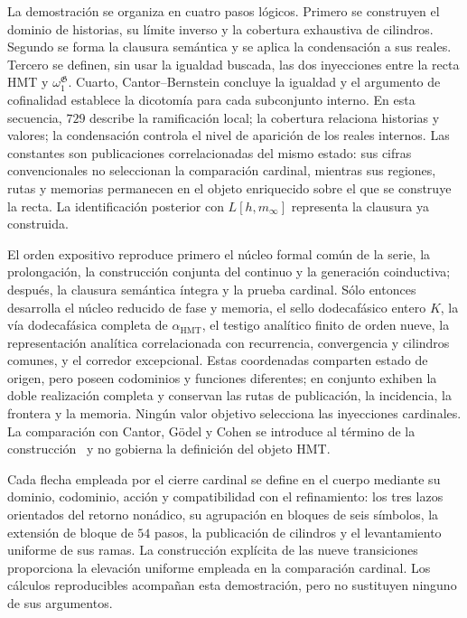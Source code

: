 La demostración se organiza en cuatro pasos lógicos. Primero se construyen el
dominio de historias, su límite inverso y la cobertura exhaustiva de cilindros.
Segundo se forma la clausura semántica y se aplica la condensación a sus reales.
Tercero se definen, sin usar la igualdad buscada, las dos inyecciones entre la
recta HMT y \(\omega_1^{\mathfrak G}\). Cuarto, Cantor--Bernstein concluye la
igualdad y el argumento de cofinalidad establece la dicotomía para cada
subconjunto interno. En esta secuencia, \(729\) describe la ramificación local;
la cobertura relaciona historias y valores; la condensación controla el nivel
de aparición de los reales internos. Las constantes son publicaciones
correlacionadas del mismo estado: sus cifras convencionales no seleccionan la
comparación cardinal, mientras sus regiones, rutas y memorias permanecen en el
objeto enriquecido sobre el que se construye la recta. La
identificación posterior con \(L[h,m_\infty]\) representa la clausura ya
construida.

El orden expositivo reproduce primero el núcleo formal común de la serie, la
prolongación, la construcción conjunta del continuo y la generación
coinductiva; después, la clausura semántica íntegra y la prueba cardinal. Sólo
entonces desarrolla el núcleo reducido de fase y memoria, el sello
dodecafásico entero \(K\), la vía dodecafásica completa de
\(\alpha_{\mathrm{HMT}}\), el testigo analítico finito de orden nueve, la
representación analítica correlacionada con recurrencia, convergencia y
cilindros comunes, y el corredor excepcional. Estas coordenadas comparten
estado de origen, pero poseen codominios y funciones diferentes; en conjunto
exhiben la doble realización completa y conservan las rutas de publicación, la
incidencia, la frontera y la memoria. Ningún valor objetivo selecciona las
inyecciones cardinales. La comparación con Cantor, Gödel y Cohen se introduce
al término de la construcción~\cite{Cantor1878,Hilbert1902,Godel1938,Cohen1963,Cohen1964}
y no gobierna la definición del objeto HMT.

Cada flecha empleada por el cierre cardinal se define en el cuerpo mediante su
dominio, codominio, acción y compatibilidad con el refinamiento: los tres lazos
orientados del retorno nonádico, su agrupación en bloques de seis símbolos, la
extensión de bloque de \(54\) pasos, la publicación de cilindros y el
levantamiento uniforme de sus ramas. La construcción explícita de las nueve
transiciones proporciona la elevación uniforme empleada en la comparación
cardinal. Los cálculos reproducibles acompañan esta demostración, pero no
sustituyen ninguno de sus argumentos.

